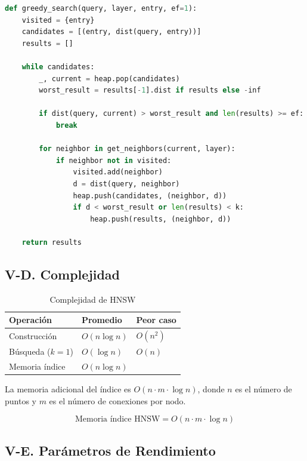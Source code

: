 \documentclass[conference]{IEEEtran}
\begin{document}
\begin{lstlisting}[language=python, caption={Búsqueda greedy simplificada}, label={lst:greedy}]
def greedy_search(query, layer, entry, ef=1):
    visited = {entry}
    candidates = [(entry, dist(query, entry))]
    results = []
    
    while candidates:
        _, current = heap.pop(candidates)
        worst_result = results[-1].dist if results else -inf
        
        if dist(query, current) > worst_result and len(results) >= ef:
            break
            
        for neighbor in get_neighbors(current, layer):
            if neighbor not in visited:
                visited.add(neighbor)
                d = dist(query, neighbor)
                heap.push(candidates, (neighbor, d))
                if d < worst_result or len(results) < k:
                    heap.push(results, (neighbor, d))
    
    return results
\end{lstlisting}

\subsection{V-D. Complejidad}

\begin{table}[htbp]
\caption{Complejidad de HNSW}
\label{tab:hnsw_complexity}
\begin{center}
\begin{tabular}{lll}
\toprule
\textbf{Operación} & \textbf{Promedio} & \textbf{Peor caso} \\
\midrule
Construcción & $O(n \log n)$ & $O(n^2)$ \\
Búsqueda ($k=1$) & $O(\log n)$ & $O(n)$ \\
Memoria índice & $O(n \log n)$ & \\
\bottomrule
\end{tabular}
\end{center}
\end{table}

La memoria adicional del índice es $O(n \cdot m \cdot \log n)$, donde $n$ es el número de puntos y $m$ es el número de conexiones por nodo.

\begin{equation}
    \text{Memoria índice HNSW} = O(n \cdot m \cdot \log n)
    \label{eq:hnsw_memory}
\end{equation}

\subsection{V-E. Parámetros de Rendimiento}
\end{document}
